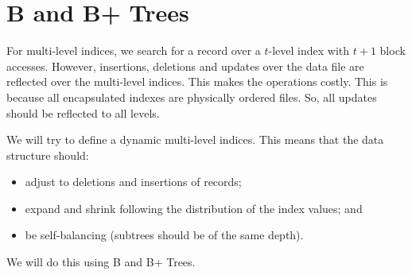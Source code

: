 \documentclass[a4paper, openany]{memoir}
\begin{document}
\newpage

\section{B and B+ Trees}
For multi-level indices, we search for a record over a $t$-level index with $t+1$ block accesses. However, insertions, deletions and updates over the data file are reflected over the multi-level indices. This makes the operations costly. This is because all encapsulated indexes are physically ordered files. So, all updates should be reflected to all levels.

We will try to define a dynamic multi-level indices. This means that the data structure should:
\begin{itemize}
    \item adjust to deletions and insertions of records;
    \item expand and shrink following the distribution of the index values; and
    \item be self-balancing (subtrees should be of the same depth).
\end{itemize}
We will do this using B and B+ Trees.
\end{document}
